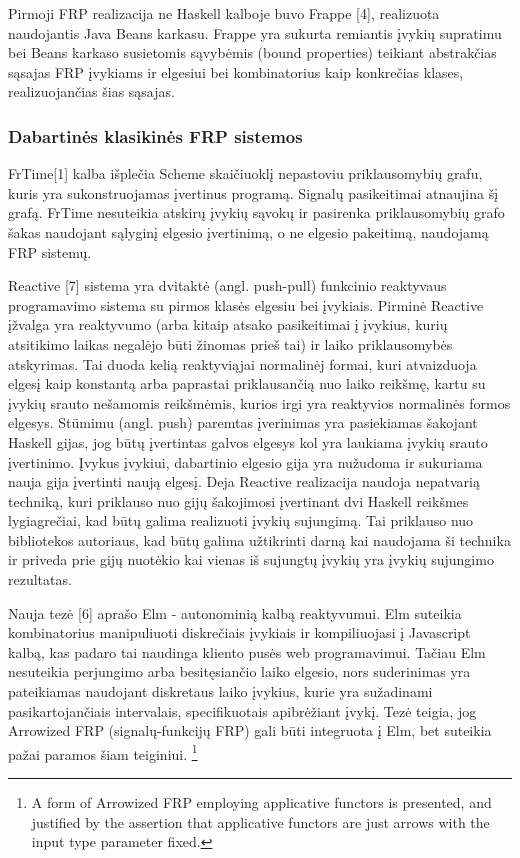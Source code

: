 Pirmoji FRP realizacija ne Haskell kalboje buvo Frappe [4], realizuota naudojantis Java Beans karkasu. Frappe yra sukurta remiantis įvykių supratimu bei Beans karkaso susietomis sąvybėmis (bound properties) teikiant abstrakčias sąsajas FRP įvykiams ir elgesiui bei kombinatorius kaip konkrečias klases, realizuojančias šias sąsajas. 

\subsubsection{Dabartinės klasikinės FRP sistemos}

FrTime[1] kalba išplečia Scheme skaičiuoklį nepastoviu priklausomybių grafu, kuris yra sukonstruojamas įvertinus programą. Signalų pasikeitimai atnaujina šį grafą. FrTime nesuteikia atskirų įvykių sąvokų ir pasirenka priklausomybių grafo šakas naudojant sąlyginį elgesio įvertinimą, o ne elgesio pakeitimą, naudojamą FRP sistemų.

Reactive [7] sistema yra dvitaktė (angl. push-pull) funkcinio reaktyvaus programavimo sistema su pirmos klasės elgesiu bei įvykiais. Pirminė Reactive įžvalga yra reaktyvumo (arba kitaip atsako pasikeitimai į įvykius, kurių atsitikimo laikas negalėjo būti žinomas prieš tai) ir laiko priklausomybės atskyrimas. Tai duoda kelią reaktyviąjai normalinėj formai, kuri atvaizduoja elgesį kaip konstantą arba paprastai priklausančią nuo laiko reikšmę, kartu su įvykių srauto nešamomis reikšmėmis, kurios irgi yra reaktyvios normalinės formos elgesys. Stūmimu (angl. push) paremtas įverinimas yra pasiekiamas šakojant Haskell gijas, jog būtų įvertintas galvos elgesys kol yra laukiama įvykių srauto įvertinimo. Įvykus įvykiui, dabartinio elgesio gija yra nužudoma ir sukuriama nauja gija įvertinti naują elgesį. Deja Reactive realizacija naudoja nepatvarią techniką, kuri priklauso nuo gijų šakojimosi įvertinant dvi Haskell reikšmes lygiagrečiai, kad būtų galima realizuoti įvykių sujungimą. Tai priklauso nuo bibliotekos autoriaus, kad būtų galima užtikrinti darną kai naudojama ši technika ir priveda prie gijų nuotėkio kai vienas iš sujungtų įvykių yra įvykių sujungimo rezultatas.

Nauja tezė [6] aprašo Elm - autonominią kalbą reaktyvumui. Elm suteikia kombinatorius manipuliuoti diskrečiais įvykiais ir kompiliuojasi į Javascript kalbą, kas padaro tai naudinga kliento pusės web programavimui. Tačiau Elm nesuteikia perjungimo arba besitęsiančio laiko elgesio, nors suderinimas yra pateikiamas naudojant diskretaus laiko įvykius, kurie yra sužadinami pasikartojančiais intervalais, specifikuotais apibrėžiant įvykį. Tezė teigia, jog Arrowized FRP (signalų-funkcijų FRP) gali būti integruota į Elm, bet suteikia pažai paramos šiam teiginiui. \footnote{A form of Arrowized FRP employing applicative functors is presented, and justified by
the assertion that applicative functors are just arrows with the input type parameter fixed.
}

